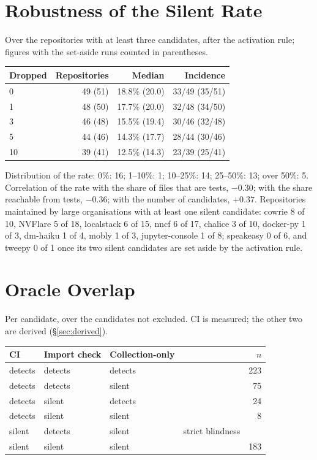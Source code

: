 \documentclass[11pt]{article}
\begin{document}
\section{Robustness of the Silent Rate}
\label{app:robustness}
Over the \nReposThree{} repositories with at least three candidates, after the activation rule; figures with the \nExclInconclusive{} set-aside runs counted in parentheses.

\begin{center}\small
\begin{tabular}{lrrr}
\hline
Dropped & Repositories & Median & Incidence \\
\hline
0 & 49 (51) & 18.8\% (20.0) & 33/49 (35/51) \\
1 & 48 (50) & 17.7\% (20.0) & 32/48 (34/50) \\
3 & 46 (48) & 15.5\% (19.4) & 30/46 (32/48) \\
5 & 44 (46) & 14.3\% (17.7) & 28/44 (30/46) \\
10 & 39 (41) & 12.5\% (14.3) & 23/39 (25/41) \\
\hline
\end{tabular}
\end{center}

Distribution of the rate: 0\%: 16; 1--10\%: 1; 10--25\%: 14; 25--50\%: 13; over 50\%: 5.
Correlation of the rate with the share of files that are tests, $-0.30$; with the share reachable from tests, $-0.36$; with the number of candidates, $+0.37$.
Repositories maintained by large organisations with at least one silent candidate: cowrie 8 of 10, NVFlare 5 of 18, localstack 6 of 15, nncf 6 of 17, chalice 3 of 10, docker-py 1 of 3, dm-haiku 1 of 4, mobly 1 of 3, jupyter-console 1 of 8; speakeasy 0 of 6, and tweepy 0 of 1 once its two silent candidates are set aside by the activation rule.

\section{Oracle Overlap}
\label{app:overlap}
Per candidate, over the \nScreenedRule{} candidates not excluded. CI is measured; the other two are derived (\S\ref{sec:derived}).

\begin{center}\small
\begin{tabular}{llll r}
\hline
CI & Import check & Collection-only & & $n$ \\
\hline
detects & detects & detects & & 223 \\
detects & detects & silent & & 75 \\
detects & silent & detects & & 24 \\
detects & silent & silent & & 8 \\
silent & detects & silent & strict blindness & \nImportCatchesCIMisses{} \\
silent & silent & silent & & 183 \\
\hline
\end{tabular}
\end{center}
\end{document}
